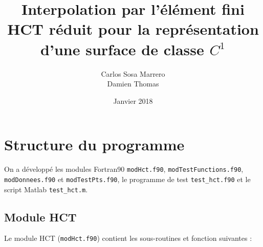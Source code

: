 \documentclass[12 pt]{article}
\title{Interpolation par l'élément fini HCT réduit
    pour la représentation d'une surface de classe $C^1$}
\date{Janvier 2018}
\author{Carlos Sosa Marrero\\
  Damien Thomas}
\begin{document}
\maketitle
\newpage
{}
\section{Structure du programme}
On a développé les modules Fortran90 \texttt{modHct.f90}, \texttt{modTestFunctions.f90}, \texttt{modDonnees.f90} et \texttt{modTestPts.f90}, le programme de test \texttt{test\_hct.f90} et le script Matlab \texttt{test\_hct.m}.
\subsection{Module HCT}
Le module HCT (\texttt{modHct.f90}) contient les sous-routines et fonction suivantes :
\end{document}
